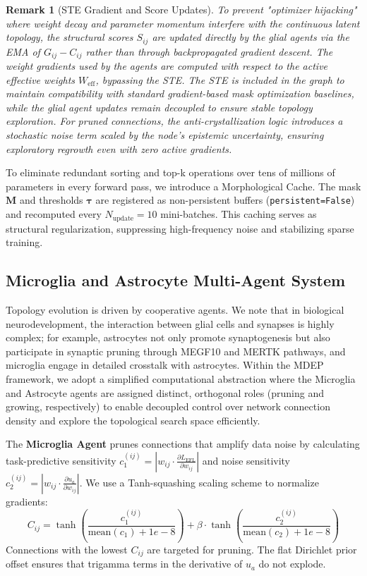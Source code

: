 \documentclass[letterpaper]{article} %
\newtheorem{remark}{Remark}
\begin{document}
\begin{remark}[STE Gradient and Score Updates]
To prevent "optimizer hijacking" where weight decay and parameter momentum interfere with the continuous latent topology, the structural scores $S_{ij}$ are updated directly by the glial agents via the EMA of $G_{ij} - C_{ij}$ rather than through backpropagated gradient descent. The weight gradients used by the agents are computed with respect to the active effective weights $W_{\text{eff}}$, bypassing the STE. The STE is included in the graph to maintain compatibility with standard gradient-based mask optimization baselines, while the glial agent updates remain decoupled to ensure stable topology exploration. For pruned connections, the anti-crystallization logic introduces a stochastic noise term scaled by the node's epistemic uncertainty, ensuring exploratory regrowth even with zero active gradients.
\end{remark}

To eliminate redundant sorting and top-k operations over tens of millions of parameters in every forward pass, we introduce a Morphological Cache. The mask $\bm{M}$ and thresholds $\bm{\tau}$ are registered as non-persistent buffers (\texttt{persistent=False}) and recomputed every $N_{\text{update}} = 10$ mini-batches. This caching serves as structural regularization, suppressing high-frequency noise and stabilizing sparse training.

\subsection{Microglia and Astrocyte Multi-Agent System}
Topology evolution is driven by cooperative agents. We note that in biological neurodevelopment, the interaction between glial cells and synapses is highly complex; for example, astrocytes not only promote synaptogenesis but also participate in synaptic pruning through MEGF10 and MERTK pathways, and microglia engage in detailed crosstalk with astrocytes. Within the MDEP framework, we adopt a simplified computational abstraction where the Microglia and Astrocyte agents are assigned distinct, orthogonal roles (pruning and growing, respectively) to enable decoupled control over network connection density and explore the topological search space efficiently.

The \textbf{Microglia Agent} prunes connections that amplify data noise by calculating task-predictive sensitivity $c_1^{(ij)} = | w_{ij} \cdot \frac{\partial L_{\text{EFL}}}{\partial w_{ij}} |$ and noise sensitivity $c_2^{(ij)} = | w_{ij} \cdot \frac{\partial u_a}{\partial w_{ij}} |$. We use a Tanh-squashing scaling scheme to normalize gradients:
\begin{equation}\label{eq:C_ij}
    C_{ij} = \tanh\!\left(\frac{c_1^{(ij)}}{\text{mean}(c_1) + 1e-8}\right) + \beta \cdot \tanh\!\left(\frac{c_2^{(ij)}}{\text{mean}(c_2) + 1e-8}\right)
\end{equation}
Connections with the lowest $C_{ij}$ are targeted for pruning. The flat Dirichlet prior offset ensures that trigamma terms in the derivative of $u_a$ do not explode.
\end{document}
